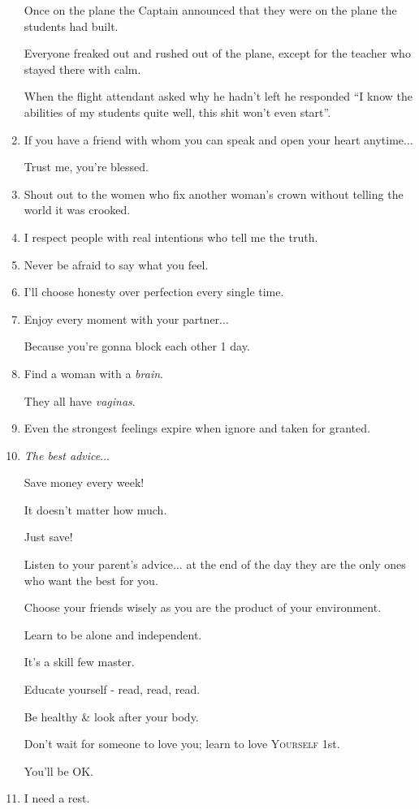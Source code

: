 \documentclass{article}
\begin{document}
\begin{enumerate}
	Once on the plane the Captain announced that they were on the plane the students had built.
	
	Everyone freaked out and rushed out of the plane, except for the teacher who stayed there with calm.
	
	When the flight attendant asked why he hadn't left he responded ``I know the abilities of my students quite well, this shit won't even start''.
	\item If you have a friend with whom you can speak and open your heart anytime$\ldots$
	
	Trust me, you're blessed.
	\item Shout out to the women who fix another woman's crown without telling the world it was crooked.
	\item I respect people with real intentions who tell me the truth.
	\item Never be afraid to say what you feel.
	\item I'll choose honesty over perfection every single time.
	\item Enjoy every moment with your partner$\ldots$
	
	Because you're gonna block each other 1 day.
	\item Find a woman with a \textit{brain}.
	
	They all have \textit{vaginas}.
	\item Even the strongest feelings expire when ignore and taken for granted.
	\item \textit{The best advice}$\ldots$
	
	Save money every week!
	
	It doesn't matter how much.
	
	Just save!
	
	Listen to your parent's advice$\ldots$ at the end of the day they are the only ones who want the best for you.
	
	Choose your friends wisely as you are the product of your environment.
	
	Learn to be alone and independent.
	
	It's a skill few master.
	
	Educate yourself - read, read, read.
	
	Be healthy \& look after your body.
	
	Don't wait for someone to love you; learn to love \textsc{Yourself} 1st.
	
	You'll be OK.
	\item I need a rest.
	

\end{enumerate}
\end{document}
